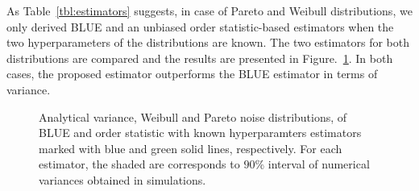 \documentclass[journal]{IEEEtran}
\begin{document}
As Table~\ref{tbl:estimators} suggests, in case of Pareto and Weibull distributions, we only derived BLUE and an unbiased order statistic-based estimators when the two hyperparameters of the distributions are known. The two estimators for both distributions are compared and the results are presented in Figure.~\ref{fig:pareto_weibull_blue_order}. In both cases, the proposed estimator outperforms the BLUE estimator in terms of variance. 
%
%
\begin{figure}[!t]
	\centering
	\hfil
	\caption{Analytical variance, Weibull and Pareto noise distributions, of BLUE and order statistic with known hyperparamters estimators marked with blue and green solid lines, respectively. For each estimator, the shaded are corresponds to $90\%$ interval of numerical variances obtained in simulations.}
	\label{fig:pareto_weibull_blue_order}
\end{figure}
%
%
\end{document}
